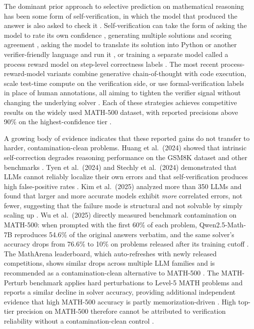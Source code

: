 \documentclass[11pt]{article}
\begin{document}
The dominant prior approach to selective prediction on mathematical reasoning has been some form of self-verification, in which the model that produced the answer is also asked to check it \citep{huang2024selfcorrect, stechly2024selfverify}. Self-verification can take the form of asking the model to rate its own confidence \citep{xiong2024llmuncertainty}, generating multiple solutions and scoring agreement \citep{wang2023selfconsistency}, asking the model to translate its solution into Python or another verifier-friendly language and run it \citep{symcode2024, prove2024, mathcoder2024}, or training a separate model called a process reward model on step-level correctness labels \citep{lightman2024prm, mathshepherd2024, qwenprm2025}. The most recent process-reward-model variants combine generative chain-of-thought with code execution, scale test-time compute on the verification side, or use formal-verification labels in place of human annotations, all aiming to tighten the verifier signal without changing the underlying solver \citep{genprm2025, fover2025, prime2025}. Each of these strategies achieves competitive results on the widely used MATH-500 dataset, with reported precisions above 90\% on the highest-confidence tier \citep{qwenprm2025, skyworkprm2024, rstarmath2025}.

A growing body of evidence indicates that these reported gains do not transfer to harder, contamination-clean problems. Huang et al.\ (2024) showed that intrinsic self-correction degrades reasoning performance on the GSM8K dataset and other benchmarks \citep{huang2024selfcorrect}. Tyen et al.\ (2024) and Stechly et al.\ (2024) demonstrated that LLMs cannot reliably localize their own errors and that self-verification produces high false-positive rates \citep{tyen2024llm, stechly2024selfverify}. Kim et al.\ (2025) analyzed more than 350 LLMs and found that larger and more accurate models exhibit \emph{more} correlated errors, not fewer, suggesting that the failure mode is structural and not solvable by simply scaling up \citep{kim2025correlated}. Wu et al.\ (2025) directly measured benchmark contamination on MATH-500: when prompted with the first 60\% of each problem, Qwen2.5-Math-7B reproduces 54.6\% of the original answers verbatim, and the same solver's accuracy drops from 76.6\% to 10\% on problems released after its training cutoff \citep{wu2025contam}. The MathArena leaderboard, which auto-refreshes with newly released competitions, shows similar drops across multiple LLM families and is recommended as a contamination-clean alternative to MATH-500 \citep{matharena2025}. The MATH-Perturb benchmark applies hard perturbations to Level-5 MATH problems and reports a similar decline in solver accuracy, providing additional independent evidence that high MATH-500 accuracy is partly memorization-driven \citep{mathperturb2025}. High top-tier precision on MATH-500 therefore cannot be attributed to verification reliability without a contamination-clean control \citep{wu2025contam, matharena2025}.
\end{document}
